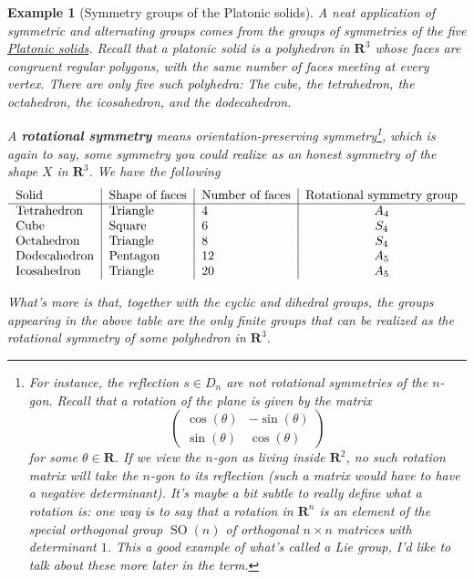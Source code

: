 \documentclass[12pt]{article}
\numberwithin{equation}{subsection}
\theoremstyle{note}
\newtheorem{example}[subsection]{Example}
\begin{document}
\begin{example}[Symmetry groups of the Platonic solids] \label{platonic-solids-ex}
A neat application of symmetric and alternating groups comes from the groups of symmetries of the five \href{https://en.wikipedia.org/wiki/Platonic_solid}{Platonic solids}. Recall that a platonic solid is a polyhedron in $\mathbf{R}^3$ whose faces are congruent regular polygons, with the same number of faces meeting at every vertex. There are only five such polyhedra: The cube, the tetrahedron, the octahedron, the icosahedron, and the dodecahedron. 

A \textbf{rotational symmetry} means \textit{orientation-preserving symmetry}\footnote{For instance, the reflection $s\in D_n$ are not rotational symmetries of the $n$-gon. Recall that a rotation of the plane is given by the matrix \[\begin{pmatrix} \cos(\theta) & - \sin(\theta) \\ \sin(\theta) & \cos(\theta) \end{pmatrix}\] for some $\theta\in\mathbf{R}$. If we view the $n$-gon as living inside $\mathbf{R}^2$, no such rotation matrix will take the $n$-gon to its reflection (such a matrix would have to have a negative determinant). It's maybe a bit subtle to really define what a rotation is: one way is to say that a rotation in $\mathbf{R}^n$ is an element of the special orthogonal group $\operatorname{SO}(n)$ of orthogonal $n\times n$ matrices with determinant $1$. This a good example of what's called a Lie group, I'd like to talk about these more later in the term.}, which is again to say, some symmetry you could realize as an honest symmetry of the shape $X$ in $\mathbf{R}^3$. We have the following
\[\begin{tabular}{l | l| l | c}
Solid &  Shape of faces & Number of faces &Rotational symmetry group \\ \hline
Tetrahedron & Triangle & 4 & $A_4$ \\
Cube & Square & 6 & $S_4$ \\
Octahedron & Triangle & 8 & $S_4$ \\
Dodecahedron & Pentagon & 12 & $A_5$ \\
Icosahedron & Triangle & 20 & $A_5$\\
\end{tabular}\]

What's more is that, together with the cyclic and dihedral groups, the groups appearing in the above table are the \textit{only} finite groups that can be realized as the rotational symmetry of some polyhedron in $\mathbf{R}^3$. 
\end{example}
\end{document}
